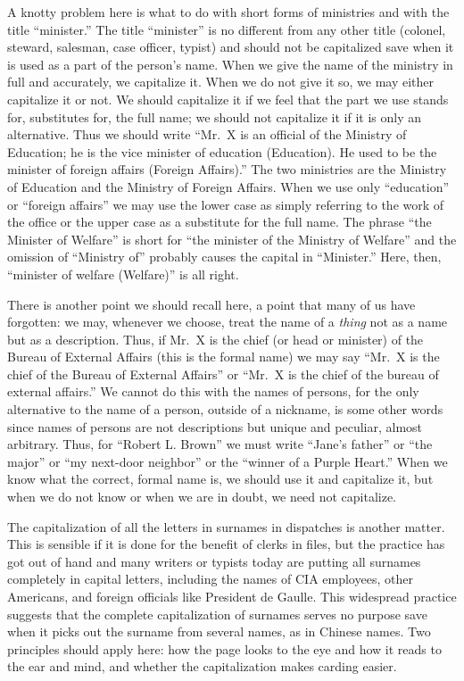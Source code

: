 \documentclass[
    oneside,
    11pt,
]{memoir}
\begin{document}
A knotty problem here is what to do with short forms of ministries and with the title \enquote{minister.} The title \enquote{minister} is no different from any other title (colonel, steward, salesman, case officer, typist) and should not be capitalized save when it is used as a part of the person's name. When we give the name of the ministry in full and accurately, we capitalize it. When we do not give it so, we may either capitalize it or not. We should capitalize it if we feel that the part we use stands for, substitutes for, the full name; we should not capitalize it if it is only an alternative. Thus we should write \enquote{Mr.\ X is an official of the Ministry of Education; he is the vice minister of education (Education). He used to be the minister of foreign affairs (Foreign Affairs).} The two ministries are the Ministry of Education and the Ministry of Foreign Affairs. When we use only \enquote{education} or \enquote{foreign affairs} we may use the lower case as simply referring to the work of the office or the upper case as a substitute for the full name. The phrase \enquote{the Minister of Welfare} is short for \enquote{the minister of the Ministry of Welfare} and the omission of \enquote{Ministry of} probably causes the capital in \enquote{Minister.} Here, then, \enquote{minister of welfare (Welfare)} is all right. 

There is another point we should recall here, a point that many of us have forgotten: we may, whenever we choose, treat the name of a \emph{thing} not as a name but as a description. Thus, if Mr.\ X is the chief (or head or minister) of the Bureau of External Affairs (this is the formal name) we may say \enquote{Mr.\ X is the chief of the Bureau of External Affairs} or \enquote{Mr.\ X is the chief of the bureau of external affairs.} We cannot do this with the names of persons, for the only alternative to the name of a person, outside of a nickname, is some other words since names of persons are not descriptions but unique and peculiar, almost arbitrary. Thus, for \enquote{Robert L. Brown} we must write \enquote{Jane's father} or \enquote{the major} or \enquote{my next-door neighbor} or the \enquote{winner of a Purple Heart.} When we know what the correct, formal name is, we should use it and capitalize it, but when we do not know or when we are in doubt, we need not capitalize. 

The capitalization of all the letters in surnames in dispatches is another matter. This is sensible if it is done for the benefit of clerks in files, but the practice has got out of hand and many writers or typists today are putting all surnames completely in capital letters, including the names of CIA employees, other Americans, and foreign officials like President de Gaulle. This widespread practice suggests that the complete capitalization of surnames serves no purpose save when it picks out the surname from several names, as in Chinese names. Two principles should apply here: how the page looks to the eye and how it reads to the ear and mind, and whether the capitalization makes carding easier. 
\end{document}
